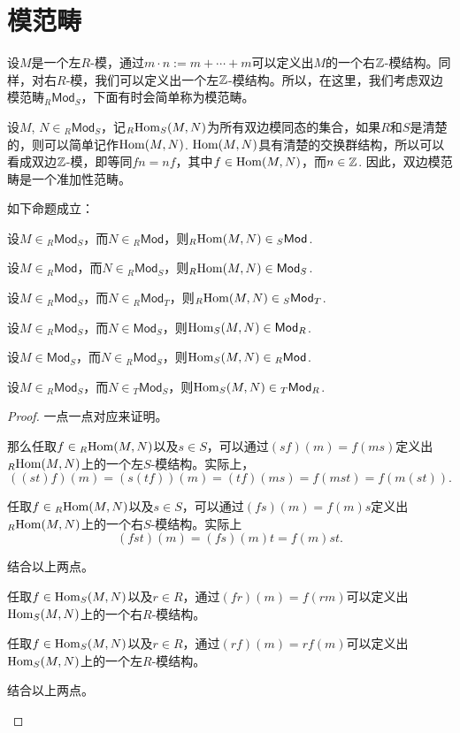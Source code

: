 \section{模范畴}

设$M$是一个左$R$-模，通过$m\cdot n:=m+\cdots+m$可以定义出$M$的一个右$\mathbb{Z}$-模结构。同样，对右$R$-模，我们可以定义出一个左$\mathbb{Z}$-模结构。所以，在这里，我们考虑双边模范畴${}_R\mathsf{Mod}_S$，下面有时会简单称为模范畴。

设$M$, $N\in {}_R\mathsf{Mod}_S$，记${}_R\!\operatorname{Hom}_S(M,N)$为所有双边模同态的集合，如果$R$和$S$是清楚的，则可以简单记作$\operatorname{Hom}(M,N)$. $\operatorname{Hom}(M,N)$具有清楚的交换群结构，所以可以看成双边$\mathbb{Z}$-模，即等同$fn=nf$，其中$f\in \operatorname{Hom}(M,N)$，而$n\in \mathbb{Z}$. 因此，双边模范畴是一个准加性范畴。

\begin{lem}\label{lemmod}如下命题成立：
\begin{compactenum}[~~~(1)]
\item 设$M\in {}_R\mathsf{Mod}_S$，而$N\in {}_R\mathsf{Mod}$，则${}_R\!\operatorname{Hom}(M,N)\in {}_S\mathsf{Mod}$.
\item 设$M\in {}_R\mathsf{Mod}$，而$N\in {}_R\mathsf{Mod}_S$，则${}_R\!\operatorname{Hom}(M,N)\in \mathsf{Mod}_S$.
\item 设$M\in {}_R\mathsf{Mod}_S$，而$N\in {}_R\mathsf{Mod}_T$，则${}_R\!\operatorname{Hom}(M,N)\in {}_S\mathsf{Mod}_T$.
\item 设$M\in {}_R\mathsf{Mod}_S$，而$N\in \mathsf{Mod}_S$，则$\operatorname{Hom}_S(M,N)\in \mathsf{Mod}_R$.
\item 设$M\in \mathsf{Mod}_S$，而$N\in {}_R\mathsf{Mod}_S$，则$\operatorname{Hom}_S(M,N)\in {}_R\mathsf{Mod}$.
\item 设$M\in {}_R\mathsf{Mod}_S$，而$N\in {}_T\mathsf{Mod}_S$，则$\operatorname{Hom}_S(M,N)\in {}_T\mathsf{Mod}_R$.
\end{compactenum}
\end{lem}

\begin{proof}
一点一点对应来证明。
\begin{compactenum}[(1)]
\item 那么任取$f\in {}_R\!\operatorname{Hom}(M,N)$以及$s\in S$，可以通过$(sf)(m)=f(ms)$定义出${}_R\!\operatorname{Hom}(M,N)$上的一个左$S$-模结构。实际上，
\[
	((st)f)(m)=(s(tf))(m)=(tf)(ms)=f(mst)=f(m(st)).
\]

\item 任取$f\in {}_R\!\operatorname{Hom}(M,N)$以及$s\in S$，可以通过$(fs)(m)=f(m)s$定义出${}_R\!\operatorname{Hom}(M,N)$上的一个右$S$-模结构。实际上
\[
	(fst)(m)=(fs)(m)t=f(m)st.
\]

\item 结合以上两点。

\item 任取$f\in \operatorname{Hom}_S(M,N)$以及$r\in R$，通过$(fr)(m)=f(rm)$可以定义出$\operatorname{Hom}_S(M,N)$上的一个右$R$-模结构。

\item 任取$f\in \operatorname{Hom}_S(M,N)$以及$r\in R$，通过$(rf)(m)=rf(m)$可以定义出$\operatorname{Hom}_S(M,N)$上的一个左$R$-模结构。

\item 结合以上两点。\qedhere
\end{compactenum}
\end{proof}

